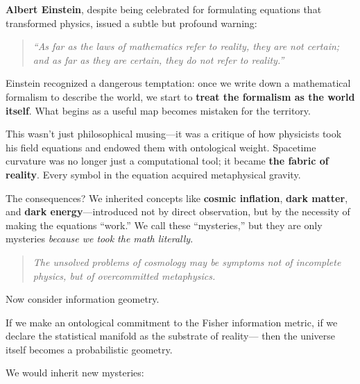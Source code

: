 \begin{tcolorbox}[colback=yellow!5!white, colframe=yellow!50!black, title={Historical Sidebar: Einstein’s Warning Against Reification}, breakable]
    \textbf{Albert Einstein}, despite being celebrated for formulating equations that transformed physics, issued a subtle but profound warning:
    
    \begin{quote}
    \textit{“As far as the laws of mathematics refer to reality, they are not certain; and as far as they are certain, they do not refer to reality.”}
    \end{quote}
    
    Einstein recognized a dangerous temptation: once we write down a mathematical formalism to describe the world, we start to \textbf{treat the formalism as the world itself}.  What begins as a useful map becomes mistaken for the territory.
    
    \medskip
    
    This wasn’t just philosophical musing—it was a critique of how physicists took his field equations and endowed them with ontological weight.  Spacetime curvature was no longer just a computational tool; it became \textbf{the fabric of reality}.  Every symbol in the equation acquired metaphysical gravity.
    
    \medskip
    
    The consequences?  We inherited concepts like \textbf{cosmic inflation}, \textbf{dark matter}, and \textbf{dark energy}—introduced not by direct observation, but by the necessity of making the equations “work.”  We call these “mysteries,” but they are only mysteries \textit{because we took the math literally}.
    
    \begin{quote}
    \textit{The unsolved problems of cosmology may be symptoms not of incomplete physics, but of overcommitted metaphysics.}
    \end{quote}
    
    \medskip
    
    Now consider information geometry.

    \medskip
    
    If we make an ontological commitment to the Fisher information metric,  if we declare the statistical manifold as the substrate of reality—  then the universe itself becomes a probabilistic geometry.

    \medskip
    
    We would inherit new mysteries:


\end{tcolorbox}
